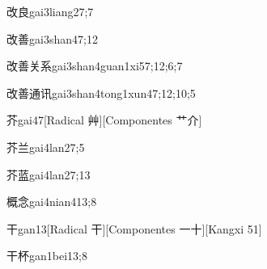 
\begin{verbete}{改良}{gai3liang2}{7;7}
\end{verbete}

\begin{verbete}{改善}{gai3shan4}{7;12}
\end{verbete}

\begin{verbete}{改善关系}{gai3shan4guan1xi5}{7;12;6;7}
\end{verbete}

\begin{verbete}{改善通讯}{gai3shan4tong1xun4}{7;12;10;5}
\end{verbete}

\begin{verbete}{芥}{gai4}{7}[Radical 艸][Componentes ⺾介]
\end{verbete}

\begin{verbete}{芥兰}{gai4lan2}{7;5}
\end{verbete}

\begin{verbete}{芥蓝}{gai4lan2}{7;13}
\end{verbete}

\begin{verbete}{概念}{gai4nian4}{13;8}
\end{verbete}

\begin{verbete}{干}{gan1}{3}[Radical 干][Componentes ⼀⼗][Kangxi 51]
\end{verbete}

\begin{verbete}{干杯}{gan1bei1}{3;8}
\end{verbete}

